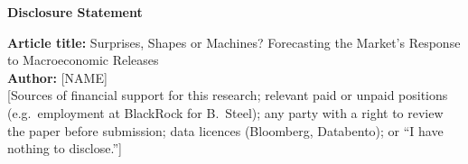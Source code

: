 \documentclass[12pt]{article}
\begin{document}
\begin{center}{\large\bfseries Disclosure Statement}\end{center}
\noindent\textbf{Article title:} Surprises, Shapes or Machines? Forecasting the Market's Response to Macroeconomic Releases\\[4pt]
\textbf{Author:} [NAME]\\[8pt]
[Sources of financial support for this research; relevant paid or unpaid positions (e.g.\
employment at BlackRock for B.\ Steel); any party with a right to review the paper before
submission; data licences (Bloomberg, Databento); or ``I have nothing to disclose.'']
\end{document}
